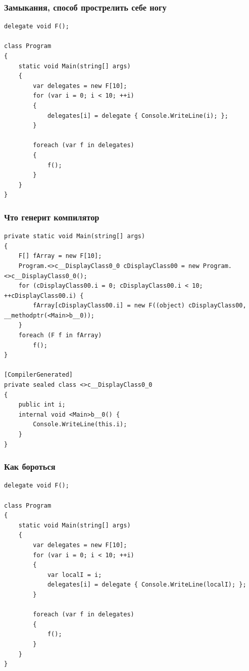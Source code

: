 \documentclass{../../slides-style}
\begin{document}
    \begin{frame}[fragile]
        \frametitle{Замыкания, способ прострелить себе ногу}
        \begin{small}
            \begin{verbatim}
delegate void F();

class Program
{
    static void Main(string[] args)
    {
        var delegates = new F[10];
        for (var i = 0; i < 10; ++i)
        {
            delegates[i] = delegate { Console.WriteLine(i); };
        }

        foreach (var f in delegates)
        {
            f();
        }
    }
}
            \end{verbatim}
        \end{small}
    \end{frame}

    \begin{frame}[fragile]
        \frametitle{Что генерит компилятор}
        \begin{scriptsize}
            \begin{verbatim}
private static void Main(string[] args)
{
    F[] fArray = new F[10];
    Program.<>c__DisplayClass0_0 cDisplayClass00 = new Program.<>c__DisplayClass0_0();
    for (cDisplayClass00.i = 0; cDisplayClass00.i < 10; ++cDisplayClass00.i) {
        fArray[cDisplayClass00.i] = new F((object) cDisplayClass00, __methodptr(<Main>b__0));
    }
    foreach (F f in fArray)
        f();
}

[CompilerGenerated]
private sealed class <>c__DisplayClass0_0
{
    public int i;
    internal void <Main>b__0() {
        Console.WriteLine(this.i);
    }
}
            \end{verbatim}
        \end{scriptsize}
    \end{frame}

    \begin{frame}[fragile]
        \frametitle{Как бороться}
        \begin{small}
            \begin{verbatim}
delegate void F();

class Program
{
    static void Main(string[] args)
    {
        var delegates = new F[10];
        for (var i = 0; i < 10; ++i)
        {
            var localI = i;
            delegates[i] = delegate { Console.WriteLine(localI); };
        }

        foreach (var f in delegates)
        {
            f();
        }
    }
}
            \end{verbatim}
        \end{small}
    \end{frame}
\end{document}
